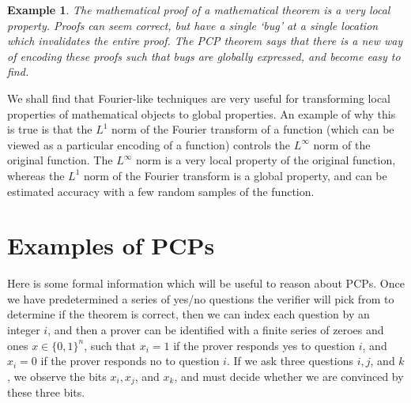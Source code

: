 \documentclass{article}
\theoremstyle{plain}
\newtheorem*{example}{Example}
\theoremstyle{definition}
\begin{document}
\begin{example}
    The mathematical proof of a mathematical theorem is a {\it very} local property. Proofs can seem correct, but have a single `bug' at a single location which invalidates the entire proof. The PCP theorem says that there is a new way of encoding these proofs such that bugs are globally expressed, and become easy to find.
\end{example}

We shall find that Fourier-like techniques are very useful for transforming local properties of mathematical objects to global properties. An example of why this is true is that the $L^1$ norm of the Fourier transform of a function (which can be viewed as a particular encoding of a function) controls the $L^\infty$ norm of the original function. The $L^\infty$ norm is a very local property of the original function, whereas the $L^1$ norm of the Fourier transform is a global property, and can be estimated accuracy with a few random samples of the function.

\section{Examples of PCPs}

Here is some formal information which will be useful to reason about PCPs. Once we have predetermined a series of yes/no questions the verifier will pick from to determine if the theorem is correct, then we can index each question by an integer $i$, and then a prover can be identified with a finite series of zeroes and ones $x \in \{ 0, 1 \}^n$, such that $x_i = 1$ if the prover responds yes to question $i$, and $x_i = 0$ if the prover responds no to question $i$. If we ask three questions $i,j$, and $k$, we observe the bits $x_i, x_j$, and $x_k$, and must decide whether we are convinced by these three bits.
\end{document}

